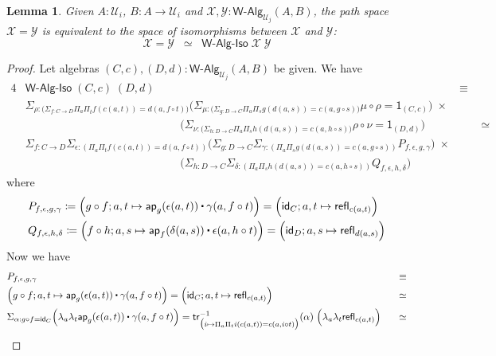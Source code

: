 \documentclass[reqno,10pt,a4paper,oneside]{amsart}
\newcommand{\X}{\mathcal{X}}
\newcommand{\Y}{\mathcal{Y}}
\newcommand{\comp}{\circ}
\newcommand{\idfun}[1]{\mathsf{id}_{#1}}
\newcommand{\prd}[1]{\Pi_{#1}}
\newcommand{\sm}[1]{\Sigma_{#1}}
\newcommand{\lam}[1]{\lambda_{#1}}
\newcommand{\defeq}{\coloneqq}
\newcommand{\refl}{\mathsf{refl}}
\newcommand{\one}{\mathsf{1}}
\newcommand{\UU}{\mathcal{U}}
\newcommand{\WAlg}{\mathsf{W}\text{-}\mathsf{Alg}}
\newcommand{\app}{\mathsf{ap}}
\newcommand{\trans}{\mathsf{tr}}
\newcommand{\WAlgIso}{\mathsf{W}\text{-}\mathsf{Alg}\text{-}\mathsf{Iso}}
\newcommand{\ct}{%
  \mathchoice{\mathbin{\raisebox{0.5ex}{$\displaystyle\centerdot$}}}%
             {\mathbin{\raisebox{0.5ex}{$\centerdot$}}}%
             {\mathbin{\raisebox{0.25ex}{$\scriptstyle\,\centerdot\,$}}}%
             {\mathbin{\raisebox{0.1ex}{$\scriptscriptstyle\,\centerdot\,$}}}}
\numberwithin{equation}{section}
\theoremstyle{mythm}
\newtheorem{lemma}[theorem]{Lemma}
\theoremstyle{mydef}
\theoremstyle{myrmk}
\begin{document}
\begin{lemma}\label{WAlgSpace}
Given $A:\UU_i$, $B : A \to \UU_i$ and $\X,\Y : \WAlg_{\UU_j}(A,B)$, the path space $\X = \Y$ is equivalent to the space of isomorphisms between $\X$ and $\Y$:
\[ \X = \Y \;\; \simeq \;\; \WAlgIso \; \X \; \Y \] 
\end{lemma}
\begin{proof}
Let algebras $(C,c), (D,d) : \WAlg_{\UU_j}(A,B)$ be given. We have
\begin{alignat*}{4}
& \WAlgIso \; (C,c) \; (D,d) & \equiv \\
& \sm{\rho : \big(\sm{f:C\to D} \prd{a}\prd{t} f(c(a,t)) = d(a,f \comp t) \big)} \Big(\sm{\mu : \big(\sm{g:D\to C} \prd{a}\prd{s} g(d(a,s)) = c(a,g \comp s)\big)} \mu \comp \rho = \one_{(C,c)} \Big)\; \times & \\
& \;\;\;\;\;\;\;\;\;\;\;\;\;\;\;\;\;\;\;\;\;\;\;\;\;\;\;\;\;\;\;\;\;\;\;\;\;\;\;\;\;\;\;\;\;\;\;\;\;\;\Big(\sm{\nu : \big(\sm{h:D\to C} \prd{a}\prd{s} h(d(a,s))=c(a,h\comp s)\big)} \rho \comp \nu = \one_{(D,d)}\Big) & \;\;\;\;\;\;\; \simeq \\
& \sm{f : C\to D} \sm{\epsilon : (\prd{a}\prd{t} f(c(a,t)) = d(a,f \comp t))} \Big(\sm{g:D\to C} \sm{\gamma : (\prd{a}\prd{s} g(d(a,s)) = c(a,g \comp s))} P_{f,\epsilon,g,\gamma}\Big) \; \times & \\
& \;\;\;\;\;\;\;\;\;\;\;\;\;\;\;\;\;\;\;\;\;\;\;\;\;\;\;\;\;\;\;\;\;\;\;\;\;\;\;\;\;\;\;\;\;\;\;\;\;\; \Big(\sm{h:D\to C} \sm{\delta : (\prd{a}\prd{s} h(d(a,s))=c(a,h\comp s))} Q_{f,\epsilon,h,\delta} \Big) &
\end{alignat*}
where
\begin{align*}
& P_{f,\epsilon,g,\gamma} \defeq \Big(g \comp f; a,t \mapsto \app_g(\epsilon(a,t)) \ct \gamma(a, f \comp t)\Big) = \Big(\idfun{C}; a,t \mapsto \refl_{c(a,t)}\Big) \\
& Q_{f,\epsilon,h,\delta} \defeq \Big(f \comp h; a,s \mapsto \app_f(\delta(a,s)) \ct \epsilon(a, h \comp t)\Big) = \Big(\idfun{D}; a,s \mapsto \refl_{d(a,s)}\Big)
\end{align*}
Now we have
\begin{alignat*}{4}
& P_{f,\epsilon,g,\gamma} & \equiv \\
& \Big(g \comp f; a,t \mapsto \app_g(\epsilon(a,t)) \ct \gamma(a, f \comp t)\Big) = \Big(\idfun{C}; a,t \mapsto \refl_{c(a,t)}\Big) & \simeq \\
& \sm{\alpha : g \comp f = \idfun{C}} \Big(\lam{a}\lam{t} \app_g(\epsilon(a,t)) \ct \gamma(a, f \comp t)\Big) = \trans^{-1}_{\big(i \mapsto \prd{a}\prd{t} i(c(a,t)) = c(a,i \comp t)\big)}(\alpha) \; \Big(\lam{a}\lam{t} \refl_{c(a,t)}\Big) & \;\;\; \simeq \\

\end{alignat*}
\end{proof}
\end{document}
